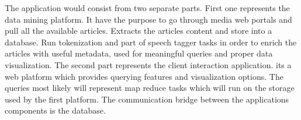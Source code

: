 The application would consist from two separate parts. First one represents the data mining platform. It have the purpose to go through media web portals and pull all the available articles. Extracts the articles content and store into a database. Run tokenization and part of speech tagger tasks in order to enrich the articles with useful metadata, used for meaningful queries and proper data visualization. The second part represents the client interaction application. its a web platform which provides querying features and visualization options. The queries most likely will represent map reduce tasks which will run on the storage used by the first platform. The communication bridge between the applications components is the database.

\clearpage